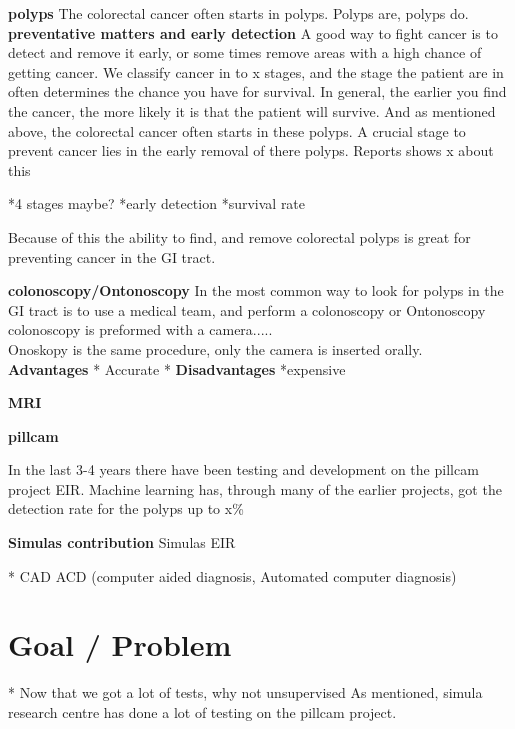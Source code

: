 \documentclass[a4paper,english]{ifimaster}
\begin{document}
	
	\vspace{10px}
	\textbf{polyps}
	The colorectal cancer often starts in polyps. Polyps are, polyps do.
	\\
	
	\vspace{10px}
	\textbf{preventative matters and early detection}
	A good way to fight cancer is to detect and remove it early, or some times remove areas with a high chance of  getting cancer.
	We classify cancer in to x stages, and the stage the patient are in often determines the chance you have for survival. 
	In general, the earlier you find the cancer, the more likely it is that the patient will survive. 
	And as mentioned above, the colorectal cancer often starts in these polyps. A crucial stage to prevent cancer lies in the 
	early removal of there polyps.
	Reports shows x about this %
	
	*4 stages maybe?
	*early detection
	*survival rate
	
		
	Because of this the ability to find, and remove colorectal polyps is great for preventing cancer in the GI tract. 
	
	
	\vspace{10px}
	\textbf{colonoscopy/Ontonoscopy}
	In the most common way to look for polyps in the GI tract is to use a medical team, and perform a colonoscopy or Ontonoscopy
	colonoscopy is preformed with a camera.....\\
	Onoskopy is the same procedure, only the camera is inserted orally. \\
	\textbf{Advantages}
	  * Accurate 
	  *
	\vspace{10px}
	\textbf{Disadvantages}
	  *expensive 
	
	\vspace{10px}
	\textbf{MRI}
	
	\vspace{10px}
	\textbf{pillcam}
	
	In the last 3-4 years there have been testing and development on the pillcam project EIR. Machine learning has, through 
	many of the earlier projects, got the detection rate for the polyps up to x\% %
	
	
	\vspace{10px}
	\textbf{Simulas contribution}
	Simulas EIR
		

		
	* CAD ACD (computer aided diagnosis, Automated computer diagnosis)
	
	\section{Goal / Problem}
		* Now that we got a lot of tests, why not unsupervised
		As mentioned, simula research centre has done a lot of testing on the pillcam project.
		  
\end{document}
